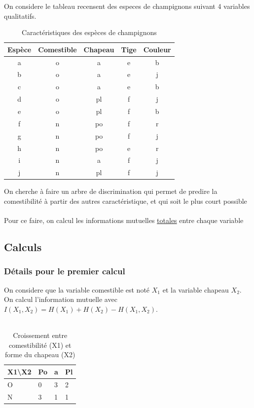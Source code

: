 \documentclass{article}
\begin{document}
On considere le tableau recensent des especes de champignons suivant 4 variables qualitatifs. 

\begin{table}[h]
  \centering
  \caption{Caractéristiques des espèces de champignons}
  \begin{tabular}{@{}ccccc@{}}
  \toprule
  Espèce & Comestible & Chapeau & Tige & Couleur \\ \midrule
  a      & o          & a       & e    & b       \\
  b      & o          & a       & e    & j       \\
  c      & o          & a       & e    & b       \\
  d      & o          & pl      & f    & j       \\
  e      & o          & pl      & f    & b       \\
  f      & n          & po      & f    & r       \\
  g      & n          & po      & f    & j       \\
  h      & n          & po      & e    & r       \\
  i      & n          & a       & f    & j       \\
  j      & n          & pl      & f    & j       \\ \bottomrule
  \end{tabular}
  
  \label{tab:champignons}
  \end{table}

  On cherche à faire un arbre de discrimination qui permet de predire la comestibilité à partir des autres caractéristique, et qui soit 
  le plus court possible
  \\
  \\
  Pour ce faire, on calcul les informations mutuelles \underline{totales} entre chaque variable

  \subsection{Calculs}

  \subsubsection{Détails pour le premier calcul}
  On considere que la variable comestible est noté $X_1$ et la variable chapeau $X_2$.
  \\
  On calcul l'information mutuelle avec $I(X_1,X_2) = H(X_1) + H(X_2) - H(X_1,X_2)$.
  \\
  \\
  \begin{table}[H]
    \centering
    \caption{Croissement entre comestibilité (X1) et forme du chapeau (X2)}
    \begin{tabular}{|l|l|l|l|}
    \hline
    X1\textbackslash{}X2 & Po & a & Pl \\ \hline
    O                    & 0  & 3 & 2  \\ \hline
    N                    & 3  & 1 & 1  \\ \hline
    \end{tabular}
    \end{table}
\end{document}
